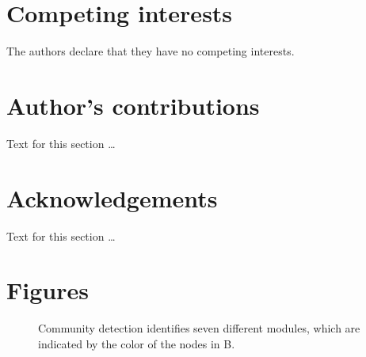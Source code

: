 \documentclass{bmcart}
\begin{document}

\begin{backmatter}

\section*{Competing interests}
  The authors declare that they have no competing interests.

\section*{Author's contributions}
    Text for this section \ldots

\section*{Acknowledgements}
  Text for this section \ldots


\section*{Figures}
  \begin{figure}[h!]
  \caption{
      Community detection identifies seven different modules, which are indicated by the color of the nodes in B.}
      \end{figure}


\end{backmatter}
\end{document}
